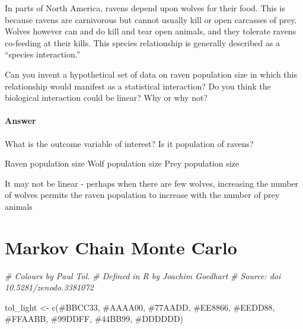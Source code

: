 \documentclass[
]{book}
\newenvironment{Shaded}{\begin{snugshade}}{\end{snugshade}}
\newcommand{\CommentTok}[1]{\textcolor[rgb]{0.56,0.35,0.01}{\textit{#1}}}
\newcommand{\FunctionTok}[1]{\textcolor[rgb]{0.00,0.00,0.00}{#1}}
\newcommand{\NormalTok}[1]{#1}
\newcommand{\OtherTok}[1]{\textcolor[rgb]{0.56,0.35,0.01}{#1}}
\newcommand{\StringTok}[1]{\textcolor[rgb]{0.31,0.60,0.02}{#1}}
\begin{document}
In parts of North America, ravens depend upon wolves for their food. This is because ravens are carnivorous but cannot usually kill or open carcasses of prey. Wolves however can and do kill and tear open animals, and they tolerate ravens co-feeding at their kills. This species relationship is generally described as a ``species interaction.''

Can you invent a hypothetical set of data on raven population size in which this relationship would manifest as a statistical interaction? Do you think the biological interaction could be linear? Why or why not?

\hypertarget{answer-80}{%
\subsubsection*{Answer}\label{answer-80}}

What is the outcome variable of interest? Is it population of ravens?

Raven population size
Wolf population size
Prey population size

It may not be linear - perhaps when there are few wolves, increasing the number of wolves permits the raven population to increase with the number of prey animals

\hypertarget{markov_chain}{%
\chapter{Markov Chain Monte Carlo}\label{markov_chain}}

\begin{Shaded}
\begin{Highlighting}[]
\CommentTok{\# Colours by Paul Tol.}
\CommentTok{\# Defined in R by Joachim Goedhart }
\CommentTok{\# Source: doi 10.5281/zenodo.3381072}

\NormalTok{tol\_light }\OtherTok{\textless{}{-}} \FunctionTok{c}\NormalTok{(}\StringTok{\textquotesingle{}\#BBCC33\textquotesingle{}}\NormalTok{, }\StringTok{\textquotesingle{}\#AAAA00\textquotesingle{}}\NormalTok{, }\StringTok{\textquotesingle{}\#77AADD\textquotesingle{}}\NormalTok{, }\StringTok{\textquotesingle{}\#EE8866\textquotesingle{}}\NormalTok{, }\StringTok{\textquotesingle{}\#EEDD88\textquotesingle{}}\NormalTok{, }\StringTok{\textquotesingle{}\#FFAABB\textquotesingle{}}\NormalTok{, }\StringTok{\textquotesingle{}\#99DDFF\textquotesingle{}}\NormalTok{, }\StringTok{\textquotesingle{}\#44BB99\textquotesingle{}}\NormalTok{, }\StringTok{\textquotesingle{}\#DDDDDD\textquotesingle{}}\NormalTok{)}
\end{Highlighting}
\end{Shaded}
\end{document}
